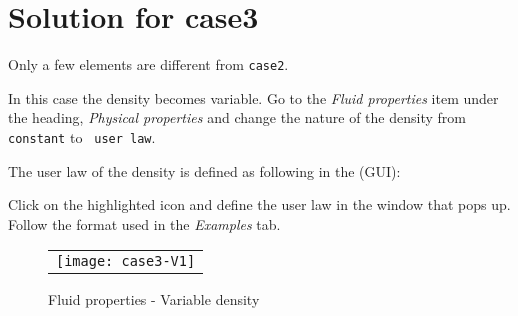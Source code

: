 
%
%
%
%


\section{Solution for case3}

Only a few elements are different from \texttt{case2}.

In this case the density becomes variable.
Go to the {\itshape Fluid properties} item under the heading, {\itshape Physical properties}
and change the nature of the density from \texttt{constant} to \texttt{ user law}.

The user law of the density is defined as following in the \CS (GUI):\\

Click on the highlighted icon and define the user law in the window that pops up.
Follow the format used in the {\itshape Examples} tab.

\begin{figure}[h!]
\begin{center}
\begin{tabular}{c}
\texttt{[image: case3-V1]}
\end{tabular}
\caption{Fluid properties - Variable density}
\end{center}
\end{figure}

